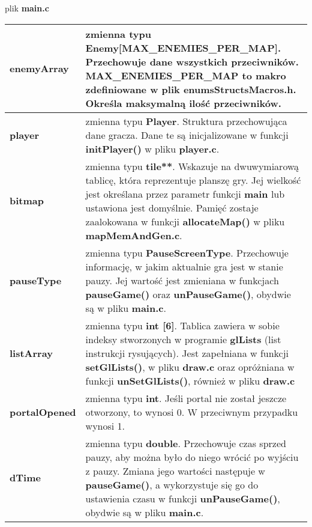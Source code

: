 \documentclass[12pt,a4paper]{article}
\begin{document}
\newpage
{\Large plik \textbf{main.c}}
\begin{center}
\begin{tabularx}{\linewidth}{ |l|X| } 
 \hline
\textbf{ enemyArray }& 
 zmienna typu \textbf{Enemy[MAX\_ENEMIES\_PER\_MAP]}. 
Przechowuje dane wszystkich przeciwników. 
\textbf{MAX\_ENEMIES\_PER\_MAP} to makro zdefiniowane w plik \textbf{enumsStructsMacros.h}. Określa maksymalną ilość przeciwników.\\ 

 \hline
\textbf{ player }&
 zmienna typu \textbf{Player}. Struktura przechowująca dane gracza. Dane te są inicjalizowane w funkcji \textbf{initPlayer()} w pliku \textbf{player.c}.\\

 \hline
\textbf{ bitmap} & 
zmienna typu \textbf{tile**}. Wskazuje na dwuwymiarową tablicę, która reprezentuje planszę gry. Jej wielkość jest określana przez parametr funkcji \textbf{main} lub ustawiona jest domyślnie. Pamięć zostaje zaalokowana w funkcji \textbf{allocateMap()} w pliku \textbf{mapMemAndGen.c}.\\ 

 \hline
\textbf{pauseType} & 
zmienna typu \textbf{PauseScreenType}. Przechowuje informację, w jakim aktualnie gra jest w stanie pauzy. Jej wartość jest zmieniana w funkcjach \textbf{pauseGame()} oraz \textbf{unPauseGame()}, obydwie są w pliku \textbf{main.c}.\\

\hline
\textbf{listArray}&
zmienna typu \textbf{int [6]}. Tablica zawiera w sobie indeksy stworzonych w programie \textbf{glLists} (list instrukcji rysujących). Jest zapełniana w funkcji \textbf{setGlLists()}, w pliku \textbf{draw.c} oraz opróżniana w funkcji \textbf{unSetGlLists()}, również w pliku \textbf{draw.c} \\

\hline
\textbf{portalOpened} &
zmienna typu \textbf{int}. Jeśli portal nie został jeszcze otworzony, to wynosi 0. W przeciwnym przypadku wynosi 1.\\

\hline 
\textbf{dTime} &
zmienna typu \textbf{double}. Przechowuje czas sprzed pauzy, aby można było do niego wrócić po wyjściu z pauzy. Zmiana jego wartości następuje w \textbf{pauseGame()}, a wykorzystuje się go do ustawienia czasu w funkcji \textbf{unPauseGame()}, obydwie są w pliku \textbf{main.c}.\\

\hline
\end{tabularx}
\end{center}
\end{document}
